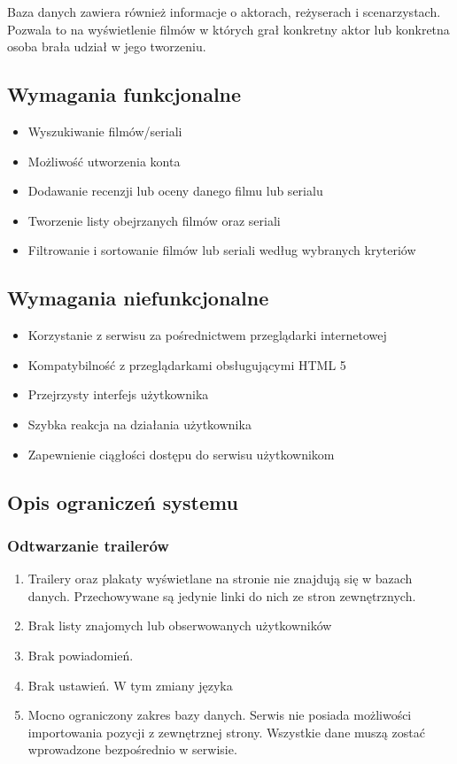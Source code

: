 \documentclass[12pt]{article}
\begin{document}
	Baza danych zawiera również informacje o aktorach, reżyserach i scenarzystach. Pozwala to na wyświetlenie filmów w których grał konkretny aktor lub konkretna osoba brała udział w jego tworzeniu.
		
		\subsection{Wymagania funkcjonalne}
			\begin{itemize}
				\item Wyszukiwanie filmów/seriali
				\item Możliwość utworzenia konta
				\item Dodawanie recenzji lub oceny danego filmu lub serialu
				\item Tworzenie listy obejrzanych filmów oraz seriali
				\item Filtrowanie i sortowanie filmów lub seriali według wybranych kryteriów
			\end{itemize}
		
		\subsection{Wymagania niefunkcjonalne}
			\begin{itemize}
				\item Korzystanie z serwisu za pośrednictwem przeglądarki internetowej
				\item Kompatybilność z przeglądarkami obsługującymi HTML 5
				\item Przejrzysty interfejs użytkownika
				\item Szybka reakcja na działania użytkownika
				\item Zapewnienie ciągłości dostępu do serwisu użytkownikom
			\end{itemize}
		
		\subsection{Opis ograniczeń systemu}
			\subsubsection{Odtwarzanie trailerów}
				\begin{enumerate}
					\item Trailery oraz plakaty wyświetlane na stronie nie znajdują się w bazach danych. Przechowywane są jedynie linki do nich ze stron zewnętrznych.
					\item Brak listy znajomych lub obserwowanych użytkowników \
					\item Brak powiadomień.
					\item Brak ustawień. W tym zmiany języka
					\item Mocno ograniczony zakres bazy danych. Serwis nie posiada możliwości importowania pozycji z zewnętrznej strony. Wszystkie dane muszą zostać wprowadzone bezpośrednio w serwisie.
				\end{enumerate}
						
\end{document}
